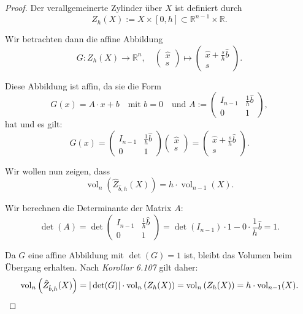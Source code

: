 \documentclass{article}
\begin{document}
\begin{proof}
  Der verallgemeinerte Zylinder über \( X \) ist definiert durch
  \[
  Z_h(X) := X \times [0, h] \subset \mathbb{R}^{n-1} \times \mathbb{R}.
  \]
  
  Wir betrachten dann die affine Abbildung
  \[
  G : Z_h(X) \rightarrow \mathbb{R}^n, \quad \begin{pmatrix} \hat{x} \\ s \end{pmatrix} \mapsto \begin{pmatrix} \hat{x} + \frac{s}{h} \hat{b} \\ s \end{pmatrix}.
  \]
  
  Diese Abbildung ist affin, da sie die Form
  \[
  G(x) = A \cdot x + b
  \quad \text{mit } b = 0
  \quad \text{und }  A := \begin{pmatrix} 
  I_{n-1} & \frac{1}{h} \hat{b} \\
  0 & 1 
  \end{pmatrix},
  \]
  hat und es gilt:
  \[
  G(x) = 
  \begin{pmatrix} 
  I_{n-1} & \frac{1}{h} \hat{b} \\
  0 & 1 
  \end{pmatrix}
  \begin{pmatrix} \hat{x} \\ s \end{pmatrix} = 
  \begin{pmatrix} \hat{x} + \frac{s}{h} \hat{b} \\ s \end{pmatrix}.
  \]
  
  Wir wollen nun zeigen, dass
  \[
  \operatorname{vol}_n \left( \hat{Z}_{\hat{b}, h}(X) \right) = h \cdot \operatorname{vol}_{n-1}(X).
  \]
  
  Wir berechnen die Determinante der Matrix \( A \):
  \[
  \det(A) = \det \begin{pmatrix} I_{n-1} & \frac{1}{h} \hat{b} \\ 0 & 1 \end{pmatrix} 
  = \det(I_{n-1}) \cdot 1 - 0 \cdot \frac{1}{h} \hat{b} = 1.
  \]
  
  Da \( G \) eine affine Abbildung mit \( \det(G) = 1 \) ist, bleibt das Volumen beim Übergang erhalten.
  Nach \textit{Korollar 6.107} gilt daher:
  \[
  \operatorname{vol}_n \left( \hat{Z}_{\hat{b}, h}(X) \right) = |\det(G)| \cdot \operatorname{vol}_n \left( Z_h(X) \right)
  =  \operatorname{vol}_n \left( Z_h(X) \right) = h \cdot \operatorname{vol}_{n-1}(X).
  \qedhere
  \]
  
\end{proof}
\end{document}
